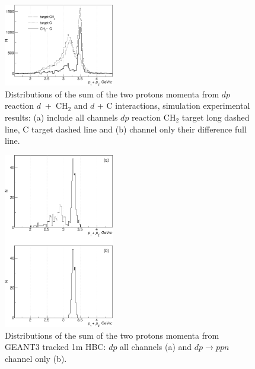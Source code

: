 \documentclass[twocolumn,epjc3]{svjour3}
\newcommand{\dpfrag} {\ensuremath{dp \rightarrow ppn}\xspace}
\providecommand{\DIFaddtex}[1]{{\protect\color{Green} \sf #1}} %
\providecommand{\DIFdeltex}[1]{{\protect\color{Red} \scriptsize #1}} %
\providecommand{\DIFdelbegin}{} %
\providecommand{\DIFaddFL}[1]{\DIFadd{#1}} %
\providecommand{\DIFdelFL}[1]{\DIFdel{#1}} %
\providecommand{\DIFaddbeginFL}{} %
\providecommand{\DIFaddendFL}{} %
\providecommand{\DIFdelbeginFL}{} %
\providecommand{\DIFdelendFL}{} %
\providecommand{\DIFadd}[1]{\texorpdfstring{\DIFaddtex{#1}}{#1}} %
\providecommand{\DIFdel}[1]{\texorpdfstring{\DIFdeltex{#1}}{}} %
\newcommand{\DIFscaledelfig}{0.5}
\newlength{\DIFdelgraphicswidth} %
\newlength{\DIFdelgraphicsheight} %
\newcommand{\DIFaddincludegraphics}[2][]{{\color{blue}\fbox{\DIFOincludegraphics[#1]{#2}}}} %
\newcommand{\DIFdelincludegraphics}[2][]{%
\sbox{\DIFdelgraphicsbox}{\DIFOincludegraphics[#1]{#2}}%
\settoboxwidth{\DIFdelgraphicswidth}{\DIFdelgraphicsbox} %
\settoboxtotalheight{\DIFdelgraphicsheight}{\DIFdelgraphicsbox} %
\scalebox{\DIFscaledelfig}{%
\parbox[b]{\DIFdelgraphicswidth}{\usebox{\DIFdelgraphicsbox}\\[-\baselineskip] \rule{\DIFdelgraphicswidth}{0em}}\llap{\resizebox{\DIFdelgraphicswidth}{\DIFdelgraphicsheight}{%
\setlength{\unitlength}{\DIFdelgraphicswidth}%
\begin{picture}(1,1)%
\thicklines\linethickness{2pt} %
{\color[rgb]{1,0,0}\put(0,0){\framebox(1,1){}}}%
{\color[rgb]{1,0,0}\put(0,0){\line( 1,1){1}}}%
{\color[rgb]{1,0,0}\put(0,1){\line(1,-1){1}}}%
\end{picture}%
}\hspace*{3pt}}} %
} %
\DeclareRobustCommand{\DIFdelbegin}{\DIFOdelbegin \let\includegraphics\DIFdelincludegraphics} %
\DeclareRobustCommand{\DIFaddbeginFL}{\DIFOaddbeginFL \let\includegraphics\DIFaddincludegraphics} %
\DeclareRobustCommand{\DIFaddendFL}{\DIFOaddendFL \let\includegraphics\DIFOincludegraphics} %
\DeclareRobustCommand{\DIFdelbeginFL}{\DIFOdelbeginFL \let\includegraphics\DIFdelincludegraphics} %
\DeclareRobustCommand{\DIFdelendFL}{\DIFOaddendFL \let\includegraphics\DIFOincludegraphics} %
\begin{document}
\DIFdelbegin %
\DIFdelendFL \DIFaddbeginFL \begin{figure}[t]
  \DIFaddendFL \centering
  \DIFdelbeginFL %
\DIFdelendFL \DIFaddbeginFL \includegraphics[width=0.43\textwidth]{p1_plus_p2_1.pdf}
  \DIFaddendFL \caption{Distributions of the sum of the two protons momenta from
    \DIFdelbeginFL \DIFdelFL{$dp$
    reaction}\DIFdelendFL \DIFaddbeginFL \DIFaddFL{$d$~+~CH$_{2}$ and $d$ + C interactions}\DIFaddendFL , \DIFdelbeginFL \DIFdelFL{simulation }\DIFdelendFL \DIFaddbeginFL \DIFaddFL{experimental }\DIFaddendFL results: \DIFdelbeginFL \DIFdelFL{(a) include all channels $dp$ reaction }\DIFdelendFL \DIFaddbeginFL \DIFaddFL{CH$_2$ target
    long dashed line, C target dashed line }\DIFaddendFL and \DIFdelbeginFL \DIFdelFL{(b)
    channel }%
\DIFdelFL{only}\DIFdelendFL \DIFaddbeginFL \DIFaddFL{their difference full line}\DIFaddendFL .}
  \DIFaddbeginFL \label{fig:p1p2exp}
\end{figure}
\begin{figure}[t]
  \centering
  \includegraphics[width=0.43\textwidth]{p1_plus_p2_2.pdf}
  \caption{\DIFaddFL{Distributions of the sum of the two protons momenta from GEANT3
    tracked 1m HBC: $dp$ all channels (a) and }\dpfrag \DIFaddFL{channel only (b).}}
  \DIFaddendFL \label{fig:p1p2sim}
\end{figure}
\end{document}
